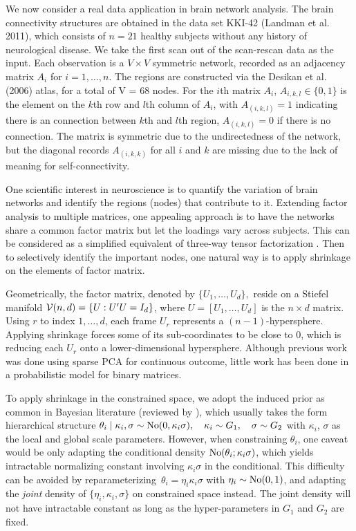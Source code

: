 \documentclass[10pt,fleqn]{article} \pdfoutput=1
\DeclareMathOperator{\1}{\mathbbm{1}} \DeclareMathOperator{\bigO}{\mc O}
\begin{document}
We now consider a real data application in brain network analysis.  The
brain connectivity structures are obtained in the data set KKI-42 (Landman
et al. 2011), which consists of $n=21$ healthy subjects without any
history of neurological disease. We take the first scan out of the
scan-rescan data as the input. Each observation is a $V\times V$ symmetric
network, recorded as an adjacency matrix $A_i$ for $i=1,\ldots,n$. The
regions are constructed via the Desikan et al. (2006) atlas, for a total
of V = 68 nodes.  For the $i$th matrix $A_i$, $A_{i,k,l} \in \{0,1\}$ is
the element on the $k$th row and $l$th column of $A_i$, with
$A_{(i,k,l)}=1$ indicating there is an connection between $k$th and $l$th
region, $A_{(i,k,l)}=0$ if there is no connection. The matrix is symmetric
due to the undirectedness of the network, but the diagonal records
$A_{(i,k,k)}$ for all $i$ and $k$ are missing due to the lack of meaning
for self-connectivity.


One scientific interest in neuroscience is to quantify the variation of
brain networks and identify the  regions (nodes) that contribute to it.
Extending factor analysis to multiple matrices, one appealing approach is
to have the networks share a common factor matrix but let the  loadings
vary across subjects. This can be considered as a simplified equivalent of
three-way tensor factorization \citep{kolda2009tensor}. Then to selectively
identify the important nodes, one natural way is to apply shrinkage on the
elements of factor matrix.


Geometrically, the factor matrix, denoted by $\{U_1,\ldots,U_d\},$ reside
on a Stiefel manifold $\mathcal{V}(n,d)=\{U: U'U=I_d\}$, where
$U=[U_1,\ldots,U_d]$ is the $n\times d$ matrix. Using $r$ to index
$1,\ldots,d$, each frame $U_r$ represents a $(n-1)$-hypersphere. Applying
shrinkage forces some of its sub-coordinates to be close to $0$, which is
reducing each $U_r$ onto a lower-dimensional hypersphere.  Although
previous work was done using sparse PCA \citep{zou2006sparse} for
continuous outcome,  little work has been done in a probabilistic model for
binary matrices.

To apply shrinkage in the constrained space, we adopt the induced prior  as
common in Bayesian  literature (reviewed by \cite{polson2012local}), which
usually takes the form hierarchical structure $\theta_i\mid \kappa_i
	,\sigma\sim \operatorname{No}(0,\kappa_i \sigma), \quad \kappa_i\sim G_1, \quad \sigma
	\sim G_2$ with $\kappa_i$, $\sigma$ as the local and global scale
parameters.  However, when constraining $\theta_i$, one caveat would be
only adapting the conditional density $\operatorname{No}(\theta_i;\kappa_i \sigma)$,
which  yields intractable normalizing constant involving $\kappa_i \sigma$
in the conditional. This difficulty can be avoided by reparameterizing\
$\theta_i=\eta_i\kappa_i\sigma$ with $\eta_i\sim\operatorname{No}(0,1)$, and adapting the
	{\it joint} density of $\{\eta_i,\kappa_i,\sigma\}$ on constrained space
instead. The joint density will not have intractable constant as long as
the hyper-parameters in $G_1$ and $G_2$ are fixed.
\end{document}
